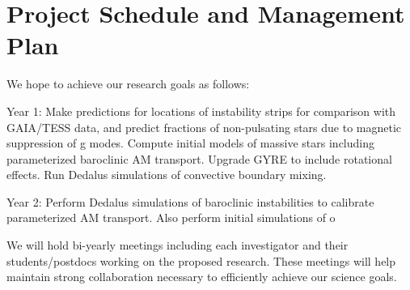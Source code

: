 \section{Project Schedule and Management Plan}

We hope to achieve our research goals as follows:

Year 1: Make predictions for locations of instability strips for comparison with GAIA/TESS data, and predict fractions of non-pulsating stars due to magnetic suppression of g modes. Compute initial models of massive stars including parameterized baroclinic AM transport. Upgrade GYRE to include rotational effects. Run Dedalus simulations of convective boundary mixing.

Year 2: Perform Dedalus simulations of baroclinic instabilities to calibrate parameterized AM transport. Also perform initial simulations of o

We will  hold bi-yearly meetings including each investigator and their students/postdocs working on the proposed research. These meetings will help maintain strong collaboration necessary to efficiently achieve our science goals.
